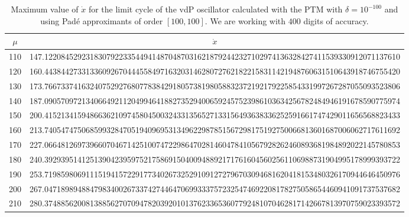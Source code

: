 \documentclass[final]{article}
\begin{document}
\begin{table}
\caption{Maximum value of $\dot{x}$ for the limit cycle of the vdP oscillator calculated with the PTM with $\delta=10^{-100}$ and using Pad\'e approximants of order $[100,100]$. We are working with $400$ digits of accuracy. }
\bigskip
\label{table_vmax_vdP2}
\begin{center}
\begin{tabular}{|c|c|}
\hline
$\mu$ &   $\dot{x}$    \\
\hline
110 &   147.12208452923183079223354494148704870316218792442327102974136328427411539330912071137610%
\\
120 &   160.44384427331336092670444558497163203146280727621822158311421948760631510643918746755420%
\\
130 &   173.76673374163240752927680778384291805738198058832372192179225854331997267287055093523806%
\\
140 &   187.09057097213406649211204994641882735294006592457523986103634256782484946191678590775974%
\\
150 &   200.41521341594866362109745804500324331356527133156493638336252591661747429011656568823433%
\\
160 &   213.74054747506859932847051940969531349622987851567298175192750066813601687006062717611692%
\\
170 &   227.06648126973966070467142510074722986470281460478410567928262460893681984892022145780853%
\\
180 &   240.39293951412513904239597521758691504009488921717616045602561106988731904995178999393722%
\\
190 &   253.71985980691115194157229177340267325291091272796703094681620418153480326170944646450976%
\\
200 &   267.04718989488479834002673374274464706993337572325474692208178275058654460941091737537682%
\\
210 &   280.37488562008138856270709478203920101376233653607792481070462817142667813970759023393572%

\end{tabular}
\end{center}
\end{table}
\end{document}
